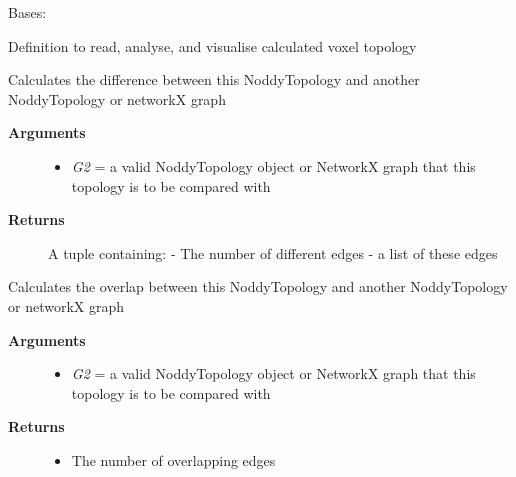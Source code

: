 \documentclass[a4paper,10pt,english]{sphinxmanual}
\begin{document}
\begin{fulllineitems}
\label{pynoddy:pynoddy.output.NoddyTopology}
Bases: 

Definition to read, analyse, and visualise calculated voxel topology

\begin{fulllineitems}
\label{pynoddy:pynoddy.output.NoddyTopology.calculate_difference}
Calculates the difference between this NoddyTopology and another NoddyTopology or networkX graph
\begin{description}
\item[{\textbf{Arguments}}] \leavevmode\begin{itemize}
\item {} 
\emph{G2} = a valid NoddyTopology object or NetworkX graph that this topology is to be compared with

\end{itemize}

\item[{\textbf{Returns}}] \leavevmode
A tuple containing:
- The number of different edges 
- a list of these edges

\end{description}

\end{fulllineitems}


\begin{fulllineitems}
\label{pynoddy:pynoddy.output.NoddyTopology.calculate_overlap}
Calculates the overlap between this NoddyTopology and another NoddyTopology or networkX graph
\begin{description}
\item[{\textbf{Arguments}}] \leavevmode\begin{itemize}
\item {} 
\emph{G2} = a valid NoddyTopology object or NetworkX graph that this topology is to be compared with

\end{itemize}

\item[{\textbf{Returns}}] \leavevmode\begin{itemize}
\item {} 
The number of overlapping edges


\end{itemize}
\end{description}
\end{fulllineitems}
\end{fulllineitems}
\end{document}
